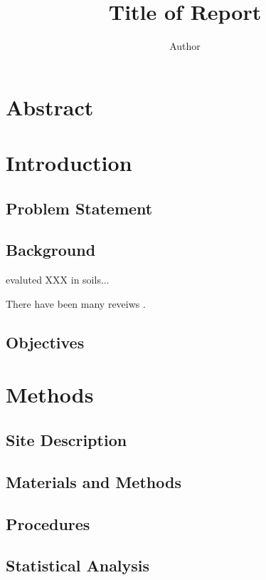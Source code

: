 \documentclass{article}\usepackage[]{graphicx}\usepackage[]{color}
\author{Author}
\title{Title of Report}
\begin{document}
\maketitle

\section{Abstract}



\section{Introduction}

\subsection{Problem Statement}

\subsection{Background}

\cite{lanphear1998contribution} evaluted XXX in soils...

There have been many reveiws \citep{tidball1976lead}.

\subsection{Objectives}



\section{Methods}

\subsection{Site Description}

\subsection{Materials and Methods}

\subsection{Procedures}

\subsection{Statistical Analysis}
\end{document}
